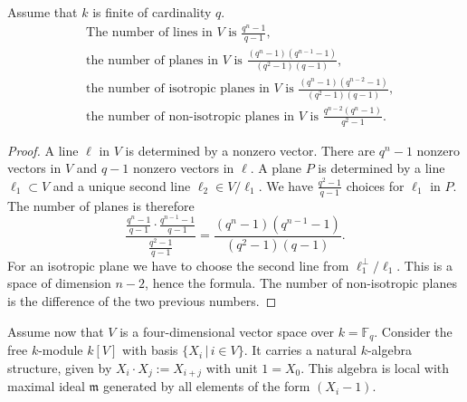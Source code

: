 \begin{proposition}\label{OrbitesSp}
Assume that $k$ is finite of cardinality $q$.
\begin{align}
&\text{The number of lines in $V$ is }\frac{q^n-1}{q-1}, \\
&\text{the number of planes in $V$ is }\frac{(q^n-1)(q^{n-1}-1)}{(q^2-1)(q-1)}, \\
&\text{the number of isotropic planes in $V$ is }\frac{(q^n-1)(q^{n-2}-1)}{(q^2-1)(q-1)}, \\
&\text{the number of non-isotropic planes in $V$ is }\frac{q^{n-2}(q^n-1)}{q^2-1}.
\end{align}
\end{proposition}
\begin{proof}
A line $\ell$ in $V$ is determined by a nonzero vector. There are $q^n - 1$ nonzero vectors in $V$ and $q-1$ nonzero vectors in $\ell$. A plane $P$ is determined by a line $\ell_1 \subset V$ and a unique second line $\ell_2\in V/\ell_1$. We have $\frac{q^2-1}{q-1}$ choices for $\ell_1$ in $P$. The number of planes is therefore
$$
\frac{ \frac{q^n-1}{q-1} \cdot\frac{q^{n-1}-1}{q-1}}{\frac{q^2-1}{q-1} } = \frac{(q^n-1)(q^{n-1}-1)}{(q^2-1)(q-1)}.
$$
For an isotropic plane we have to choose the second line from $\ell_1^\perp/\ell_1$. This is a space of dimension $n-2$, hence the formula. The number of non-isotropic planes is the difference of the two previous numbers.
\end{proof}

Assume now that $V$ is a four-dimensional vector space over $k=\mathbb F_q$. Consider the free $k$-module $k[V]$ with basis $\{X_i \,|\, i\in V\}$. It carries a natural $k$-algebra structure, given by
$X_i\cdot X_j := X_{i+j}$ with unit $1=X_0$. This algebra is local with maximal ideal $\mathfrak m$ generated by all elements of the form $(X_i-1)$.

